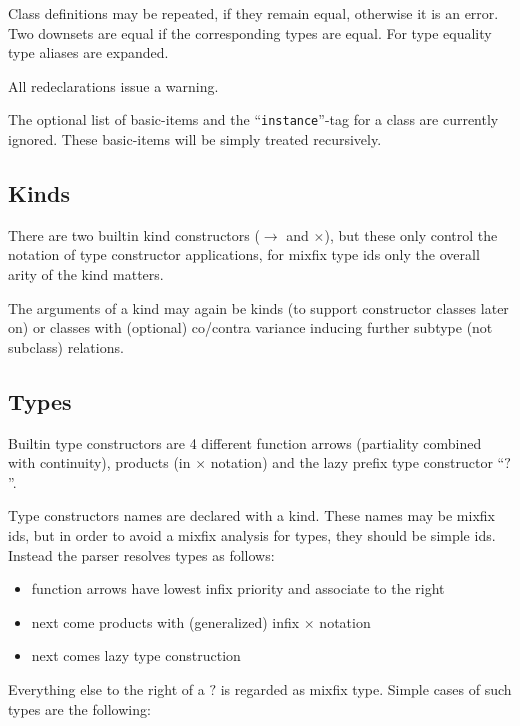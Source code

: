 \documentclass{article}
\begin{document}
Class definitions may be repeated, if they remain equal, otherwise it is an
error. Two downsets are equal if the corresponding types are equal. For type
equality type aliases are expanded.

All redeclarations issue a warning. 

The optional list of basic-items and the ``\texttt{instance}''-tag for a class
are currently ignored. These basic-items will be simply treated recursively.

\subsection{Kinds}

There are two builtin kind constructors ($\to$ and $\times$), but these only
control the notation of type constructor applications, for mixfix type ids
only the overall arity of the kind matters. 

The arguments of a kind may again be kinds (to support constructor classes
later on) or classes with (optional) co/contra variance inducing further
subtype (not subclass) relations.

\subsection{Types}

Builtin type constructors are 4 different function arrows (partiality combined
with continuity), products (in $\times$ notation) and the lazy
prefix type constructor ``$?$''.

Type constructors names are declared with a kind. These names may be mixfix
ids, but in order to avoid a mixfix analysis for types, they should be
simple ids. Instead the parser resolves types as follows:

\begin{itemize}
\item function arrows have lowest infix priority and associate to the right
\item next come products with (generalized) infix $\times$ notation
\item next comes lazy type construction
\end{itemize}

Everything else to the right of a $?$ is regarded as mixfix type. Simple cases
of such types are the following:
\end{document}

